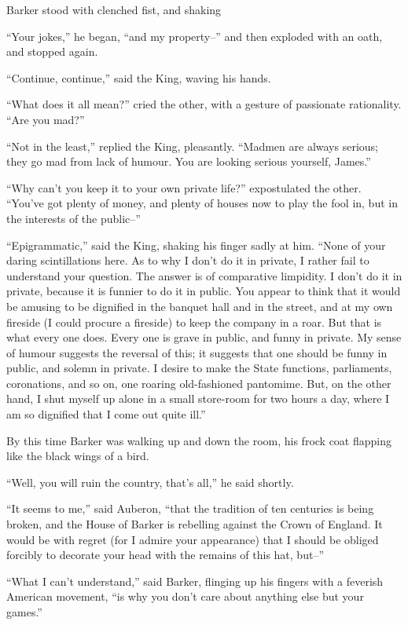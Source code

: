 \documentclass{book}
\begin{document}
Barker stood with clenched fist, and shaking

“Your jokes,” he began, “and my property–” and then exploded with an oath, and stopped again.

“Continue, continue,” said the King, waving his hands.

“What does it all mean?” cried the other, with a gesture of passionate rationality. “Are you mad?”

“Not in the least,” replied the King, pleasantly. “Madmen are always serious; they go mad from lack of humour. You are looking serious yourself, James.”

“Why can’t you keep it to your own private life?” expostulated the other. “You’ve got plenty of money, and plenty of houses now to play the fool in, but in the interests of the public–”

“Epigrammatic,” said the King, shaking his finger sadly at him. “None of your daring scintillations here. As to why I don’t do it in private, I rather fail to understand your question. The answer is of comparative limpidity. I don’t do it in private, because it is funnier to do it in public. You appear to think that it would be amusing to be dignified in the banquet hall and in the street, and at my own fireside (I could procure a fireside) to keep the company in a roar. But that is what every one does. Every one is grave in public, and funny in private. My sense of humour suggests the reversal of this; it suggests that one should be funny in public, and solemn in private. I desire to make the State functions, parliaments, coronations, and so on, one roaring old-fashioned pantomime. But, on the other hand, I shut myself up alone in a small store-room for two hours a day, where I am so dignified that I come out quite ill.”

By this time Barker was walking up and down the room, his frock coat flapping like the black wings of a bird.

“Well, you will ruin the country, that’s all,” he said shortly.

“It seems to me,” said Auberon, “that the tradition of ten centuries is being broken, and the House of Barker is rebelling against the Crown of England. It would be with regret (for I admire your appearance) that I should be obliged forcibly to decorate your head with the remains of this hat, but–”

“What I can’t understand,” said Barker, flinging up his fingers with a feverish American movement, “is why you don’t care about anything else but your games.”
\end{document}
